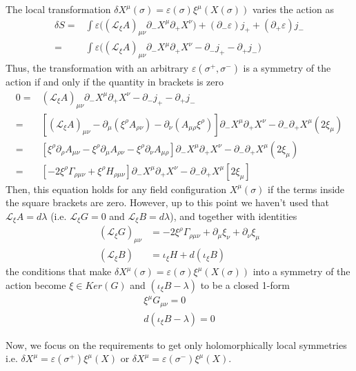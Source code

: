 \documentclass[a4paper,12pt]{article}
\numberwithin{equation}{section}
\numberwithin{thm}{section}
\numberwithin{exm}{section}
\newcommand{\p}{\partial}
\newcommand{\lag}{\mathcal L}
\newcommand{\<}{{\langle}}
\renewcommand{\>}{{\rangle}}
\renewcommand{\d}{{\delta}}
\newcommand{\ve}{{\varepsilon}}
\newcommand{\m}{{\mu}}
\newcommand{\n}{{\nu}}
\newcommand{\s}{{\sigma}}
\begin{document}
The local transformation $\d X^\m(\s)=\ve(\s) \xi^\mu(X(\s))$ varies the action as
	\begin{align}
	\d S = &\int \ve\Big((\lag_\xi A)_{\m\n} \p_- X^\m \p_+ X^\n \Big) + (\p_-\ve) j_+ + (\p_+\ve) j_- \\
	=& \int \ve\Big((\lag_\xi A)_{\mu\nu}\p_-X^\mu\p_+X^\nu-\p_-j_+-\p_+j_- \Big)
	\end{align}
Thus, the transformation with an arbitrary $\ve(\s^+,\s^-)$ is a symmetry of the action if and only if the quantity in brackets is zero
	\begin{align}
	0=&(\lag_\xi A)_{\mu\nu}\p_-X^\mu\p_+X^\nu-\p_-j_+-\p_+j_- \nonumber \\
	=&\left[(\lag_\xi A)_{\mu\nu}-\p_\mu(\xi^\rho A_{\rho\nu})-\p_\nu(A_{\mu\rho}\xi^\rho)\right] \p_-X^\mu\p_+X^\nu - \p_-\p_+X^\mu(2\xi_\mu) \nonumber \\
	=&\left[ \xi^\rho\p_\rho A_{\mu\nu}-\xi^\rho \p_\mu A_{\rho\nu}-\xi^\rho\p_\nu A_{\mu\rho} \right]\p_-X^\mu\p_+X^\nu - \p_-\p_+X^\mu(2\xi_\mu) \nonumber \\
	=&\left[-2\xi^\rho\Gamma_{\rho\mu\nu} + \xi^\rho H_{\rho\mu\nu}\right]\p_-X^\mu\p_+X^\nu-\p_-\p_+X^\mu[2\xi_\mu]
	\end{align}
Then, this equation holds for any field configuration $X^\mu(\s)$ if the terms inside the square brackets are zero. However, up to this point we haven't used that $\lag_\xi A=d\lambda$ (i.e. $\lag_\xi G=0$ and $\lag_\xi B=d\lambda$), and together with identities
	\begin{align}
	(\lag_\xi G)_{\mu\nu}&=-2\xi^\rho\Gamma_{\rho\mu\nu}+ \p_\mu \xi_\nu + \p_\nu \xi_\mu \\
	(\lag_\xi B)&=\iota_\xi H+ d(\iota_\xi B)
	\end{align}
the conditions that make $\delta X^\mu(\s)=\ve(\s)\xi^\mu(X(\s))$ into a symmetry of the action become $\xi\in Ker(G)$ and $(\iota_\xi B-\lambda)$ to be a closed 1-form
	\begin{align}
	\xi^\mu G_{\mu\nu}=0\\
	d(\iota_\xi B-\lambda)=0
	\end{align}

Now, we focus on the requirements to get only holomorphically local symmetries i.e. $\delta X^\mu=\varepsilon(\s^+)\xi^\mu(X)$ or $\delta X^\mu=\varepsilon(\s^-)\xi^\mu(X)$.
\end{document}
